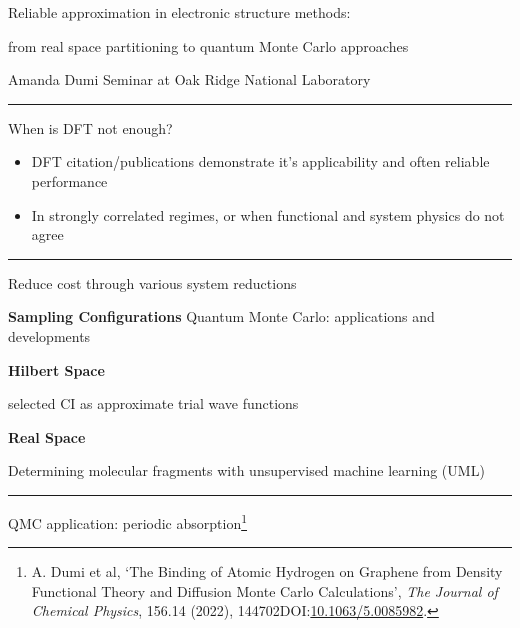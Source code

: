 \documentclass[
  letterpaper,
  DIV=11,
  numbers=noendperiod]{scrartcl}
\author{Amanda Dumi}
\date{}
\providecommand{\tightlist}{%
  \setlength{\itemsep}{0pt}\setlength{\parskip}{0pt}}\usepackage{longtable,booktabs,array}
\begin{document}
\ifdefined\Shaded\renewenvironment{Shaded}{\begin{tcolorbox}[interior hidden, frame hidden, breakable, enhanced, boxrule=0pt, sharp corners, borderline west={3pt}{0pt}{shadecolor}]}{\end{tcolorbox}}\fi

\newcommand{\bra}[1]{\left<#1\right|}\newcommand{\ket}[1]{\left|#1\right>}\newcommand{\bk}[2]{\left<#1\middle|#2\right>}\newcommand{\bke}[3]{\left<#1\middle|#2\middle|#3\right>}

Reliable approximation in electronic structure methods:

from real space partitioning to quantum Monte Carlo approaches

Amanda Dumi Seminar at Oak Ridge National Laboratory

\hypertarget{current_date}{}

\begin{center}\rule{0.5\linewidth}{0.5pt}\end{center}

When is DFT not enough?

\begin{itemize}
\tightlist
\item
  DFT citation/publications demonstrate it's applicability and often
  reliable performance
\item
  In strongly correlated regimes, or when functional and system physics
  do not agree
\end{itemize}

\begin{center}\rule{0.5\linewidth}{0.5pt}\end{center}

Reduce cost through various system reductions

\textbf{Sampling Configurations} Quantum Monte Carlo: applications and
developments

\textbf{Hilbert Space}

selected CI as approximate trial wave functions

\textbf{Real Space}

Determining molecular fragments with unsupervised machine learning (UML)

\begin{center}\rule{0.5\linewidth}{0.5pt}\end{center}

QMC application:{ periodic absorption\footnote{A. Dumi et al, {`The
  Binding of Atomic Hydrogen on Graphene from Density Functional Theory
  and Diffusion Monte Carlo Calculations'}, \emph{The Journal of
  Chemical Physics}, 156.14 (2022),
  144702DOI:\href{https://doi.org/10.1063/5.0085982}{10.1063/5.0085982}.}}
\end{document}
